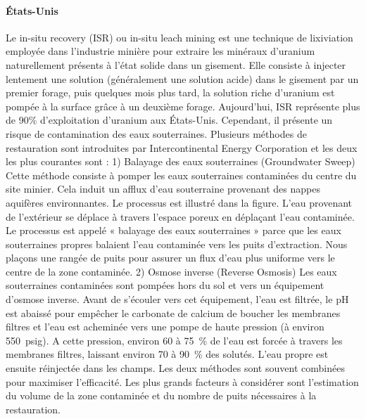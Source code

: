 \documentclass{article}
\begin{document}
\paragraph{États-Unis}
Le in-situ recovery (ISR) ou in-situ leach mining est une technique de lixiviation employée dans l’industrie minière pour extraire les minéraux d’uranium naturellement présents à l'état solide dans un gisement. Elle consiste à injecter lentement une solution (généralement une solution acide) dans le gisement par un premier forage, puis quelques mois plus tard, la solution riche d’uranium est pompée à la surface grâce à un deuxième forage. 
Aujourd’hui, ISR représente plus de 90\% d’exploitation d’uranium aux États-Unis. Cependant, il présente un risque de contamination des eaux souterraines. Plusieurs méthodes de restauration sont introduites par Intercontinental Energy Corporation et les deux les plus courantes sont :
1)  	Balayage des eaux souterraines (Groundwater Sweep)
Cette méthode consiste à pomper les eaux souterraines contaminées du centre du site minier. Cela induit un afflux d'eau souterraine provenant des nappes aquifères environnantes. Le processus est illustré dans la figure. L'eau provenant de l'extérieur se déplace à travers l'espace poreux en déplaçant l'eau contaminée. Le processus est appelé « balayage des eaux souterraines » parce que les eaux souterraines propres balaient l'eau contaminée vers les puits d’extraction. Nous plaçons une rangée de puits pour assurer un flux d’eau plus uniforme vers le centre de la zone contaminée.
2)  	Osmose inverse (Reverse Osmosis)
Les eaux souterraines contaminées sont pompées hors du sol et vers un équipement d'osmose inverse. Avant de s'écouler vers cet équipement, l'eau est filtrée, le pH est abaissé pour empêcher le carbonate de calcium de boucher les membranes filtres et l'eau est acheminée vers une pompe de haute pression (à environ 550~psig). A cette pression, environ 60 à 75~\% de l'eau est forcée à travers les membranes filtres, laissant environ 70 à 90~\% des solutés. L'eau propre est ensuite réinjectée dans les champs.
Les deux méthodes sont souvent combinées pour maximiser l’efficacité. Les plus grands facteurs à considérer sont l'estimation du volume de la zone contaminée et du nombre de puits nécessaires à la restauration.
\end{document}
